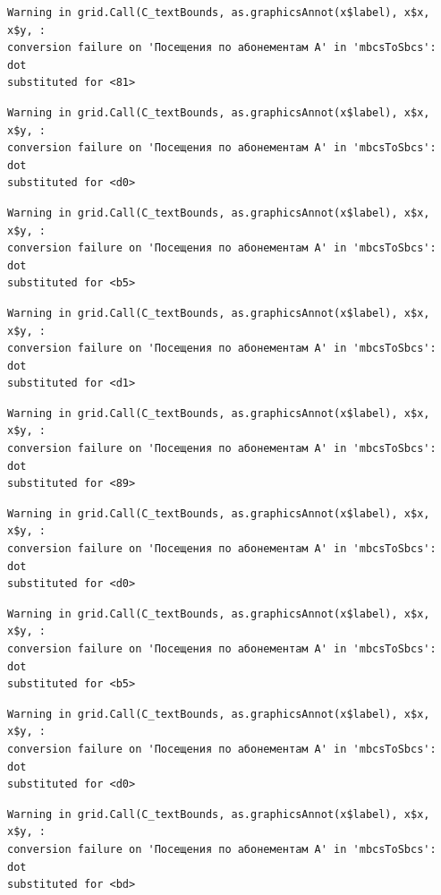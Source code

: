 \documentclass[
  letterpaper,
  DIV=11,
  numbers=noendperiod]{scrartcl}
\begin{document}
\begin{verbatim}
Warning in grid.Call(C_textBounds, as.graphicsAnnot(x$label), x$x, x$y, :
conversion failure on 'Посещения по абонементам А' in 'mbcsToSbcs': dot
substituted for <81>
\end{verbatim}

\begin{verbatim}
Warning in grid.Call(C_textBounds, as.graphicsAnnot(x$label), x$x, x$y, :
conversion failure on 'Посещения по абонементам А' in 'mbcsToSbcs': dot
substituted for <d0>
\end{verbatim}

\begin{verbatim}
Warning in grid.Call(C_textBounds, as.graphicsAnnot(x$label), x$x, x$y, :
conversion failure on 'Посещения по абонементам А' in 'mbcsToSbcs': dot
substituted for <b5>
\end{verbatim}

\begin{verbatim}
Warning in grid.Call(C_textBounds, as.graphicsAnnot(x$label), x$x, x$y, :
conversion failure on 'Посещения по абонементам А' in 'mbcsToSbcs': dot
substituted for <d1>
\end{verbatim}

\begin{verbatim}
Warning in grid.Call(C_textBounds, as.graphicsAnnot(x$label), x$x, x$y, :
conversion failure on 'Посещения по абонементам А' in 'mbcsToSbcs': dot
substituted for <89>
\end{verbatim}

\begin{verbatim}
Warning in grid.Call(C_textBounds, as.graphicsAnnot(x$label), x$x, x$y, :
conversion failure on 'Посещения по абонементам А' in 'mbcsToSbcs': dot
substituted for <d0>
\end{verbatim}

\begin{verbatim}
Warning in grid.Call(C_textBounds, as.graphicsAnnot(x$label), x$x, x$y, :
conversion failure on 'Посещения по абонементам А' in 'mbcsToSbcs': dot
substituted for <b5>
\end{verbatim}

\begin{verbatim}
Warning in grid.Call(C_textBounds, as.graphicsAnnot(x$label), x$x, x$y, :
conversion failure on 'Посещения по абонементам А' in 'mbcsToSbcs': dot
substituted for <d0>
\end{verbatim}

\begin{verbatim}
Warning in grid.Call(C_textBounds, as.graphicsAnnot(x$label), x$x, x$y, :
conversion failure on 'Посещения по абонементам А' in 'mbcsToSbcs': dot
substituted for <bd>
\end{verbatim}
\end{document}
